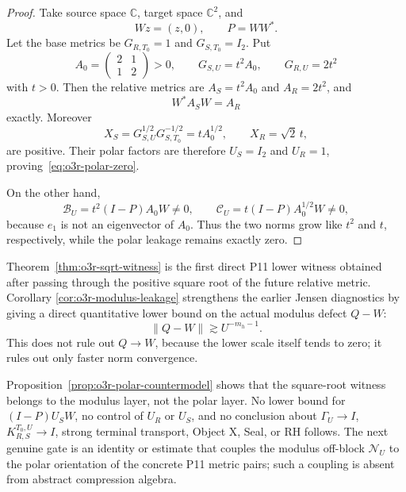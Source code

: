 \begin{proof}
Take source space $\mathbb C$, target space $\mathbb C^2$, and
\[
 Wz=(z,0),\qquad P=WW^*.
\]
Let the base metrics be
$G_{R,T_0}=1$ and $G_{S,T_0}=I_2$.  Put
\[
 A_0=\begin{pmatrix}2&1\\1&2\end{pmatrix}>0,
 \qquad
 G_{S,U}=t^2A_0,
 \qquad
 G_{R,U}=2t^2
\]
with $t>0$.  Then the relative metrics are
$A_S=t^2A_0$ and $A_R=2t^2$, and
\[
 W^*A_SW=A_R
\]
exactly.  Moreover
\[
 X_S=G_{S,U}^{1/2}G_{S,T_0}^{-1/2}=tA_0^{1/2},
 \qquad
 X_R=\sqrt2\,t,
\]
are positive.  Their polar factors are therefore
$U_S=I_2$ and $U_R=1$, proving~\eqref{eq:o3r-polar-zero}.

On the other hand,
\[
 \mathscr B_U=t^2(I-P)A_0W\ne0,
 \qquad
 \mathscr C_U=t(I-P)A_0^{1/2}W\ne0,
\]
because $e_1$ is not an eigenvector of $A_0$.  Thus the two norms grow like $t^2$ and
$t$, respectively, while the polar leakage remains exactly zero.
\end{proof}

\begin{remark}[R19 firewall]\label{rem:o3r-firewall}
Theorem~\ref{thm:o3r-sqrt-witness} is the first direct P11 lower witness obtained after
passing through the positive square root of the future relative metric.  Corollary
\ref{cor:o3r-modulus-leakage} strengthens the earlier Jensen diagnostics by giving a
direct quantitative lower bound on the actual modulus defect $Q-W$:
\[
 \|Q-W\|\gtrsim U^{-m_h-1}.
\]
This does not rule out $Q\to W$, because the lower scale itself tends to zero; it rules
out only faster norm convergence.

Proposition~\ref{prop:o3r-polar-countermodel} shows that the square-root witness belongs
to the modulus layer, not the polar layer.  No lower bound for
$(I-P)U_SW$, no control of $U_R$ or $U_S$, and no conclusion about
$\Gamma_U\to I$, $K_{R,S}^{T_0,U}\to I$, strong terminal transport, Object X, Seal, or
RH follows.  The next genuine gate is an identity or estimate that couples the modulus
off-block $\mathscr N_U$ to the polar orientation of the concrete P11 metric pairs;
such a coupling is absent from abstract compression algebra.
\end{remark}
